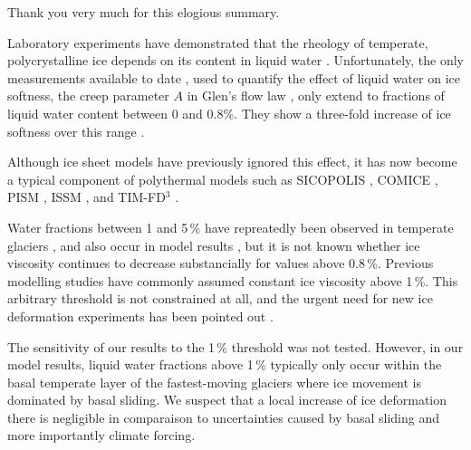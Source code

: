     Thank you very much for this elogious summary.





    Laboratory experiments have demonstrated that the rheology of temperate,
    polycrystalline ice depends on its content in liquid water
    \citep[p.~65--66]{Cuffey.Paterson.2010}. Unfortunately, the only
    measurements available to date \citep{Duval.1977}, used to quantify the
    effect of liquid water on ice softness, the creep parameter $A$ in Glen's
    flow law \citep{Lliboutry.Duval.1985}, only extend to fractions of liquid
    water content between 0 and 0.8\%. They show a three-fold increase of ice
    softness over this range \citep[Fig.~1]{Duval.1977}.

    Although ice sheet models have previously ignored this effect, it has now
    become a typical component of polythermal models such as SICOPOLIS
    \citep{Greve.1997}, COMICE \citep{Ruckamp.etal.2010}, PISM
    \citep{Aschwanden.etal.2012}, ISSM \citep{Seroussi.etal.2013}, and
    TIM-FD$\unit{^{3}}$ \citep{Kleiner.Humbert.2014}.

    Water fractions between 1 and 5\,\% have repreatedly been observed in
    temperate glaciers \citep{Murray.etal.2000, Murray.etal.2007,
    Bradford.Harper.2005, Bradford.etal.2009}, and also occur in model results
    \citep[e.g.,][]{Blatter.Greve.2015}, but it is not known whether ice
    viscosity continues to decrease substancially for values above 0.8\,\%.
    Previous modelling studies have commonly assumed constant ice viscosity
    above 1\,\%. This arbitrary threshold is not constrained at all, and the
    urgent need for new ice deformation experiments has been pointed out
    \citep{Kleiner.etal.2015}.

    The sensitivity of our results to the 1\,\% threshold was not tested.
    However, in our model results, liquid water fractions above 1\,\% typically
    only occur within the basal temperate layer of the fastest-moving glaciers
    where ice movement is dominated by basal sliding. We suspect that a local
    increase of ice deformation there is negligible in comparaison to
    uncertainties caused by basal sliding and more importantly climate forcing.

